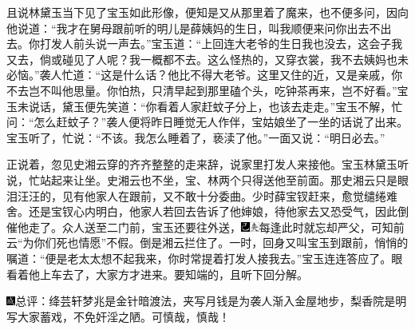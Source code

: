 且说林黛玉当下见了宝玉如此形像，便知是又从那里着了魔来，也不便多问，因向他说道：``我才在舅母跟前听的明儿是薛姨妈的生日，叫我顺便来问你出去不出去。你打发人前头说一声去。''宝玉道：``上回连大老爷的生日我也没去，这会子我又去，倘或碰见了人呢？我一概都不去。这么怪热的，又穿衣裳，我不去姨妈也未必恼。''袭人忙道：``这是什么话？他比不得大老爷。这里又住的近，又是亲戚，你不去岂不叫他思量。你怕热，只清早起到那里磕个头，吃钟茶再来，岂不好看。''宝玉未说话，黛玉便先笑道：``你看着人家赶蚊子分上，也该去走走。''宝玉不解，忙问：``怎么赶蚊子？''袭人便将昨日睡觉无人作伴，宝姑娘坐了一坐的话说了出来。宝玉听了，忙说：``不该。我怎么睡着了，亵渎了他。''一面又说：``明日必去。''

正说着，忽见史湘云穿的齐齐整整的走来辞，说家里打发人来接他。宝玉林黛玉听说，忙站起来让坐。史湘云也不坐，宝、林两个只得送他至前面。那史湘云只是眼泪汪汪的，见有他家人在跟前，又不敢十分委曲。少时薛宝钗赶来，愈觉缱绻难舍。还是宝钗心内明白，他家人若回去告诉了他婶娘，待他家去又恐受气，因此倒催他走了。众人送至二门前，宝玉还要往外送，{\includegraphics[width=3mm]{../Images/00003}\includegraphics[width=3mm]{../Images/00012}\footnotesize \kaishu 每逢此时就忘却严父，可知前云``为你们死也情愿''不假。}倒是湘云拦住了。一时，回身又叫宝玉到跟前，悄悄的嘱道：``便是老太太想不起我来，你时常提着打发人接我去。''宝玉连连答应了。眼看着他上车去了，大家方才进来。要知端的，且听下回分解。

{\includegraphics[width=3mm]{../Images/00005}总评：绛芸轩梦兆是金针暗渡法，夹写月钱是为袭人渐入金屋地步，梨香院是明写大家蓄戏，不免奸淫之陋。可慎哉，慎哉！}
